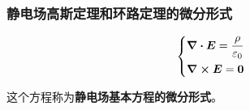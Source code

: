 \subsubsection{静电场高斯定理和环路定理的微分形式}

	

$$
\begin{dcases}
	\div \boldsymbol{E} = \frac{\rho}{\varepsilon_0} \\
	\curl \boldsymbol{E} = \boldsymbol{0}
\end{dcases}
$$

这个方程称为\textbf{静电场基本方程的微分形式}。
